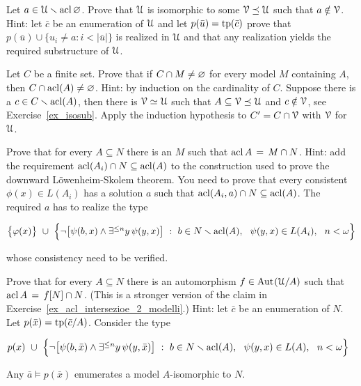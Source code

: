 \begin{exercise}\label{ex_isosub}
Let $a\in\EuScript U\smallsetminus\mathop{\rm acl}\varnothing$.
Prove that $\EuScript U$ is isomorphic to some $\EuScript V\preceq \EuScript U$ such that $a\notin\EuScript V$.
Hint: let $\bar c$ be an enumeration of $\EuScript U$ and let $p(\bar u)={\rm tp}(\bar c)$ prove that 
$p(\bar u)\cup\big\{ u_i\neq a :i<|\bar u|\big\}$ is realized in $\EuScript U$ and 
that any realization yields the required substructure of $\EuScript U$.\QED
\end{exercise}

\begin{exercise}\label{pofu2}
Let $C$ be a finite set.
Prove that if $C\cap M\neq\varnothing$ for every model $M$ containing $A$, then $C\cap\mathop{\rm acl}(A)\neq\varnothing$.
Hint: by induction on the cardinality of $C$.
Suppose there is a $c\in C\smallsetminus\mathop{\rm acl}(A)$, then there is $\EuScript V\simeq\EuScript U$ such that 
$A\subseteq\EuScript V\preceq\EuScript U$ and $c\notin\EuScript V$, see Exercise~\ref{ex_isosub}.
Apply the induction hypothesis to $C'=C\cap\EuScript V$ with $\EuScript V$ for $\EuScript U$.\QED
\end{exercise}


\begin{exercise}\label{ex_acl_intersezioe_2_modelli}
Prove that for every $A\subseteq N$ there is an $M$ such that $\mathop{\rm acl} A\,=\,M\cap N$.
Hint: add the requirement $\mathop{\rm acl}(A_i)\cap N\subseteq\mathop{\rm acl}(A)$ to the construction 
used to prove the downward L\"owenheim-Skolem theorem.
You need to prove that every consistent $\phi(x)\in L(A_i)$ has a solution $a$ such that 
$\mathop{\rm acl}(A_i,a)\cap N\subseteq\mathop{\rm acl}(A)$.
The required $a$ has to realize the type

\hfil$\big\{\phi(x)\big\}\ \cup\ \Big\{\neg\big[\psi(b,x)\wedge\E^{\le n}y\,\psi(y,x)\big]
\ :\ 
b\in N\sm\acl(A),\ \ \psi(y,x)\in L(A_i),\ \ n<\omega\Big\}$

whose consistency need to be verified.
\end{exercise}

\begin{exercise}\label{ex_acl_intersezione_2_modelli_iso}
Prove that for every $A\subseteq N$ there is an automorphism $f\in\textrm{Aut\kern.15ex}(\EuScript U/A)$ such that 
$\mathop{\rm acl} A\,=\,f[N]\cap N$. 
(This is a stronger version of the claim in Exercise~\ref{ex_acl_intersezioe_2_modelli}.) 
Hint: let $\bar c$ be an enumeration of $N$.
Let $p(\bar x)={\rm tp}(\bar c/A)$. 
Consider the type

\hfil$p(x)\ \cup\ \Big\{\neg\big[\psi(b,\bar x)\wedge\E^{\le n}y\,\psi(y,\bar x)\big]
\ :\ 
b\in N\sm\acl(A),\ \ \psi(y,x)\in L(A),\ \ n<\omega\Big\}$

Any $\bar a\models p(\bar x)$ enumerates a model $A$-isomorphic to $N$.\QED
\end{exercise}


